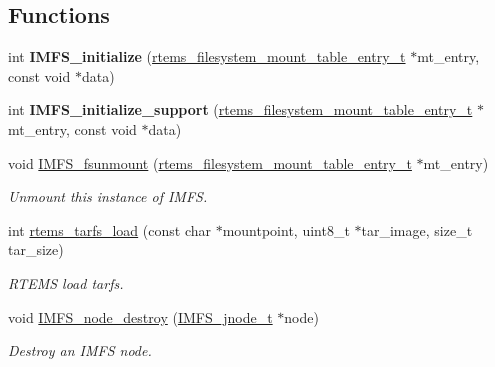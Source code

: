 \subsection*{Functions}
\begin{DoxyCompactItemize}
\item 
\mbox{\label{group__IMFS_gae277be8a6ca6ab7d9064980b9c7df0ca}} 
int {\bfseries I\+M\+F\+S\+\_\+initialize} (\mbox{\hyperlink{structrtems__filesystem__mount__table__entry__tt}{rtems\+\_\+filesystem\+\_\+mount\+\_\+table\+\_\+entry\+\_\+t}} $\ast$mt\+\_\+entry, const void $\ast$data)
\item 
\mbox{\label{group__IMFS_gacd7d80288171eaa85b9b7413c2fa959d}} 
int {\bfseries I\+M\+F\+S\+\_\+initialize\+\_\+support} (\mbox{\hyperlink{structrtems__filesystem__mount__table__entry__tt}{rtems\+\_\+filesystem\+\_\+mount\+\_\+table\+\_\+entry\+\_\+t}} $\ast$mt\+\_\+entry, const void $\ast$data)
\item 
\mbox{\label{group__IMFS_ga44e2e006596907d606161a36ffb26af7}} 
void \mbox{\hyperlink{group__IMFS_ga44e2e006596907d606161a36ffb26af7}{I\+M\+F\+S\+\_\+fsunmount}} (\mbox{\hyperlink{structrtems__filesystem__mount__table__entry__tt}{rtems\+\_\+filesystem\+\_\+mount\+\_\+table\+\_\+entry\+\_\+t}} $\ast$mt\+\_\+entry)
\begin{DoxyCompactList}\small\item\em Unmount this instance of I\+M\+FS. \end{DoxyCompactList}\item 
int \mbox{\hyperlink{group__IMFS_gace6a5eba738dd15b05c48b605e2b0baa}{rtems\+\_\+tarfs\+\_\+load}} (const char $\ast$mountpoint, uint8\+\_\+t $\ast$tar\+\_\+image, size\+\_\+t tar\+\_\+size)
\begin{DoxyCompactList}\small\item\em R\+T\+E\+MS load tarfs. \end{DoxyCompactList}\item 
\mbox{\label{group__IMFS_ga73b1c2fd935799bbb4119bfcd4ac6e4a}} 
void \mbox{\hyperlink{group__IMFS_ga73b1c2fd935799bbb4119bfcd4ac6e4a}{I\+M\+F\+S\+\_\+node\+\_\+destroy}} (\mbox{\hyperlink{structIMFS__jnode__tt}{I\+M\+F\+S\+\_\+jnode\+\_\+t}} $\ast$node)
\begin{DoxyCompactList}\small\item\em Destroy an I\+M\+FS node. \end{DoxyCompactList}\item 

\end{DoxyCompactItemize}
